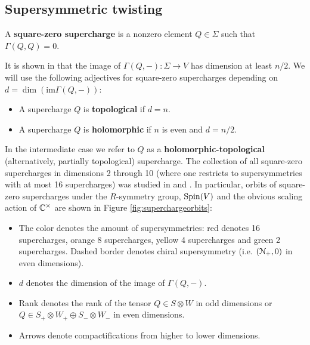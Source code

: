 \documentclass[10pt, oneside]{article}
\begin{document}
\subsection{Supersymmetric twisting}

\begin{dfn}
A {\bf square-zero supercharge} is a nonzero element $Q\in\Sigma$ such that $\Gamma(Q, Q)=0$.
\end{dfn}

It is shown in \cite[Proposition 3.25]{ElliottSafronov} that the image of $\Gamma(Q, -)\colon \Sigma\rightarrow V$ has dimension at least $n/2$. We will use the following adjectives for square-zero supercharges depending on $d=\dim(\mathrm{im}\Gamma(Q, -))$:
\begin{itemize}
\item A supercharge $Q$ is {\bf topological} if $d = n$.

\item A supercharge $Q$ is {\bf holomorphic} if $n$ is even and $d=n/2$.
\end{itemize}

In the intermediate case we refer to $Q$ as a {\bf holomorphic-topological} (alternatively, partially topological) supercharge. The collection of all square-zero supercharges in dimensions 2 through 10 (where one restricts to supersymmetries with at most 16 supercharges) was studied in \cite{ElliottSafronov} and \cite{EagerSaberiWalcher}. In particular, orbits of square-zero supercharges under the $R$-symmetry group, $\mathrm{Spin}(V)$ and the obvious scaling action of $\mathbb C^\times$ are shown in Figure \ref{fig:superchargeorbits}:
\begin{itemize}
\item The color denotes the amount of supersymmetries: red denotes 16 supercharges, orange 8 supercharges, yellow 4 supercharges and green 2 supercharges. Dashed border denotes chiral supersymmetry (i.e. $(\mathcal N_+, 0)$ in even dimensions).

\item $d$ denotes the dimension of the image of $\Gamma(Q, -)$.

\item Rank denotes the rank of the tensor $Q\in S\otimes W$ in odd dimensions or $Q\in S_+\otimes W_+\oplus S_-\otimes W_-$ in even dimensions.

\item Arrows denote compactifications from higher to lower dimensions.
\end{itemize}
\end{document}
